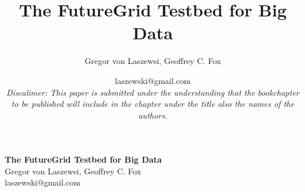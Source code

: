 \documentclass{article}
\makeatletter
\newcommand{\TITLE}{The FutureGrid Testbed for Big Data}
\newcommand{\AUTHOR}{Gregor von Laszewsi, Geoffrey C. Fox}
\newcommand{\EMAIL}{laszewski@gmail.com}
\newcommand{\DISCLAIMER}{{\em\footnotesize Discalimer: This paper is submitted under the understanding that the bookchapter to be published will include in the chapter under the title also the names of the authors.}}
\makeatother
\begin{document}
\title{\TITLE}
\author{\AUTHOR}
\date{\EMAIL\\\DISCLAIMER}








\begin{center}
{\Large\bf \TITLE}\\
{\AUTHOR}\\
{\EMAIL}
\end{center}


\tableofcontents


\newpage












\maketitle


\end{document}
